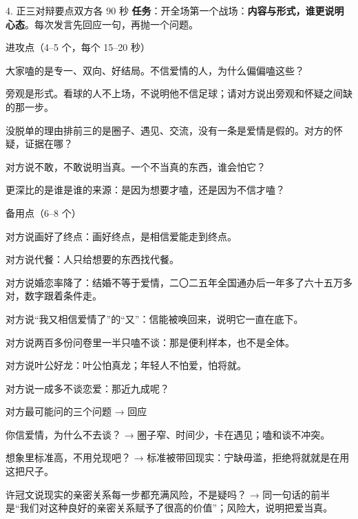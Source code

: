 \documentclass[script,pro]{debate}
\begin{document}
\begin{stage}{4. 正三对辩要点}{双方各 90 秒}
\textbf{任务}：开全场第一个战场：\textbf{内容与形式，谁更说明心态}。每次发言先回应一句，再抛一个问题。
\begin{points}{进攻点（4–5 个，每个 15–20 秒）}
\item 大家嗑的是专一、双向、好结局。不信爱情的人，为什么偏偏嗑这些？
\item 旁观是形式。看球的人不上场，不说明他不信足球；请对方说出旁观和怀疑之间缺的那一步。
\item 没脱单的理由排前三的是圈子、遇见、交流，没有一条是爱情是假的。对方的怀疑，证据在哪？
\item 对方说不敢，不敢说明当真。一个不当真的东西，谁会怕它？
\item 更深比的是谁是谁的来源：是因为想要才嗑，还是因为不信才嗑？
\end{points}
\begin{points}{备用点（6–8 个）}
\item 对方说画好了终点：画好终点，是相信爱能走到终点。
\item 对方说代餐：人只给想要的东西找代餐。
\item 对方说婚恋率降了：结婚不等于爱情，二〇二五年全国通办后一年多了六十五万多对，数字跟着条件走。
\item 对方说“我又相信爱情了”的“又”：信能被唤回来，说明它一直在底下。
\item 对方说两百多份问卷里一半只嗑不谈：那是便利样本，也不是全体。
\item 对方说叶公好龙：叶公怕真龙；年轻人不怕爱，怕将就。
\item 对方说一成多不谈恋爱：那近九成呢？
\end{points}
\begin{points}{对方最可能问的三个问题 → 回应}
\item 你信爱情，为什么不去谈？ → 圈子窄、时间少，卡在遇见；嗑和谈不冲突。
\item 想象里标准高，不用兑现吧？ → 标准被带回现实：宁缺毋滥，拒绝将就就是在用这把尺子。
\item 许冠文说现实的亲密关系每一步都充满风险，不是疑吗？ → 同一句话的前半是“我们对这种良好的亲密关系赋予了很高的价值”；风险大，说明把爱当真。
\end{points}
\end{stage}
\end{document}

